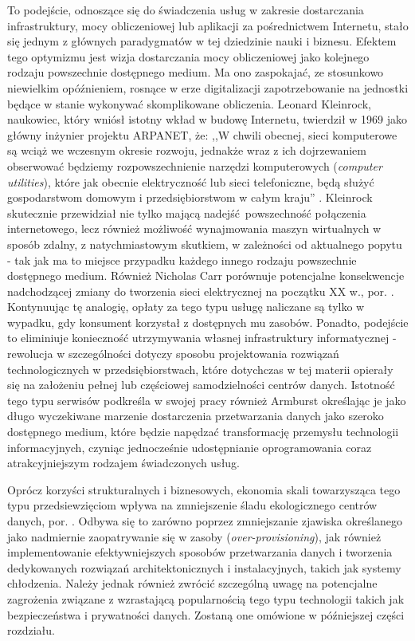 \documentclass[12pt,a4paper,twoside]{article}
\begin{document}
To podejście, odnoszące się do świadczenia usług w zakresie dostarczania infrastruktury, mocy obliczeniowej lub aplikacji za pośrednictwem Internetu, stało się jednym z głównych paradygmatów w tej dziedzinie nauki i biznesu. Efektem tego optymizmu jest wizja dostarczania mocy obliczeniowej jako kolejnego rodzaju powszechnie dostępnego medium. Ma ono zaspokajać, ze stosunkowo niewielkim opóźnieniem, rosnące w erze digitalizacji zapotrzebowanie na jednostki będące w stanie wykonywać skomplikowane obliczenia. Leonard Kleinrock, naukowiec, który wniósł istotny wkład w budowę Internetu, twierdził w 1969 jako główny inżynier projektu ARPANET, że: ,,W chwili obecnej, sieci komputerowe są wciąż we wczesnym okresie rozwoju, jednakże wraz z ich dojrzewaniem obserwować będziemy rozpowszechnienie narzędzi komputerowych (\textit{computer utilities}), które jak obecnie elektryczność lub sieci telefoniczne, będą służyć gospodarstwom domowym i przedsiębiorstwom w całym kraju''  \citep{kleinrock2005}. Kleinrock skutecznie przewidział nie tylko mającą nadejść powszechność połączenia internetowego, lecz również możliwość wynajmowania maszyn wirtualnych w sposób zdalny, z natychmiastowym skutkiem, w zależności od aktualnego popytu - tak jak ma to miejsce przypadku każdego innego rodzaju powszechnie dostępnego medium. Również Nicholas Carr porównuje potencjalne konsekwencje nadchodzącej zmiany do tworzenia sieci elektrycznej na początku XX w., por. \citet{carr2008}. Kontynuując tę analogię, opłaty za tego typu usługę naliczane są tylko w wypadku, gdy konsument korzystał z dostępnych mu zasobów. Ponadto, podejście to eliminiuje konieczność utrzymywania własnej infrastruktury informatycznej - rewolucja w szczególności dotyczy sposobu projektowania rozwiązań technologicznych w przedsiębiorstwach, które dotychczas w tej materii opierały się na założeniu pełnej lub częściowej samodzielności centrów danych. Istotność tego typu serwisów podkreśla w swojej pracy również Armburst \citep{armburst2010} określając je jako długo wyczekiwane marzenie dostarczenia przetwarzania danych jako szeroko dostępnego medium, które będzie napędzać transformację przemysłu technologii informacyjnych, czyniąc jednocześnie udostępnianie oprogramowania coraz atrakcyjniejszym rodzajem świadczonych usług.

Oprócz korzyści strukturalnych i biznesowych, ekonomia skali towarzysząca tego typu przedsiewzięciom wpływa na zmniejszenie śladu ekologicznego centrów danych, por. \citet{oecd2014}. Odbywa się to zarówno poprzez zmniejszanie zjawiska określanego jako nadmiernie zaopatrywanie się w zasoby (\textit{over-provisioning}), jak również implementowanie efektywniejszych sposobów przetwarzania danych i tworzenia dedykowanych rozwiązań architektonicznych i instalacyjnych, takich jak systemy chłodzenia. Należy jednak również zwrócić szczególną uwagę na potencjalne zagrożenia związane z wzrastającą popularnością tego typu technologii takich jak bezpieczeństwa i prywatności danych. Zostaną one omówione w późniejszej części rozdziału.
\end{document}
